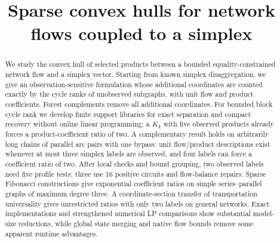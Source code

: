 \documentclass[11pt]{article}
\title{Sparse convex hulls for network flows coupled to a simplex}
\author{}
\date{}
\theoremstyle{definition}
\theoremstyle{remark}
\begin{document}
\maketitle
\begin{abstract}
We study the convex hull of selected products between a bounded
equality-constrained network flow and a simplex vector. Starting from known
simplex disaggregation, we give an observation-sensitive formulation whose
additional coordinates are counted exactly by the cycle ranks of unobserved
subgraphs, with unit flow and product coefficients. Forest complements remove
all additional coordinates. For bounded block cycle rank we develop finite
support libraries for exact separation and compact recovery without online
linear programming; a $K_4$ with five observed products already forces a
product-coefficient ratio of two. A complementary result holds on arbitrarily long
chains of parallel arc pairs with one bypass: unit flow/product descriptions
exist whenever at most three simplex labels are observed, and four labels can
force a coefficient ratio of two. After local checks and bound grouping,
two observed labels need five profile tests; three use 16 positive circuits
and flow-balance repairs. Sparse
Fibonacci constructions give exponential coefficient ratios on simple
series--parallel graphs of maximum degree three. A coordinate-section transfer
of transportation universality gives unrestricted ratios with only two labels
on general networks. Exact implementations and strengthened numerical LP
comparisons show substantial model-size reductions, while global state merging
and native flow bounds remove some apparent runtime advantages.
\end{abstract}














\end{document}

